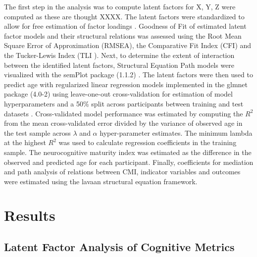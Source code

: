 \documentclass[utf8]{frontiersSCNS} %
\begin{document}
The first step in the analysis was to compute latent factors for X, Y, Z were computed as these are thought XXXX. The latent factors were standardized to allow for free estimation of factor loadings \citep{HuTzeBentler1998}. Goodness of Fit of estimated latent factor models and their structural relations was assessed using the Root Mean Square Error of Approximation (RMSEA), the Comparative Fit Index (CFI) and the Tucker-Lewis Index (TLI \cite{KennyEtAl2015,HuTzeBentler1999, wu2009evaluating}). Next, to determine the extent of interaction between the identified latent factors, Structural Equation Path models were visualized with the semPlot package (1.1.2) . The latent factors were then used to predict age with regularized linear regression models implemented in the glmnet package (4.0-2) using leave-one-out cross-validation for estimation of model hyperparameters and a 50\% split across participants between training and test datasets \citep{FriedmanHastieTibshirani2010, friedman2009glmnet}. Cross-validated model performance was estimated by computing the $R^2$ from the mean cross-validated error divided by the variance of observed age in the test sample across $\lambda$ and $\alpha$ hyper-parameter estimates. The minimum lambda at the highest $R^2$ was used to calculate regression coefficients in the training sample. The neurocognitive maturity index was estimated as the difference in the observed and predicted age for each participant. Finally, coefficients for mediation and path analysis of relations between CMI, indicator variables and outcomes were estimated using the lavaan structural equation framework.
\section{Results} 
\subsection{Latent Factor Analysis of Cognitive Metrics} 
\end{document}

